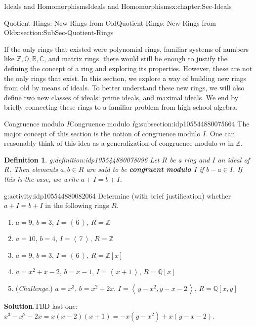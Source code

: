 \documentclass[oneside,10pt,]{book}
\newcommand{\blocktitlefont}{\relax}
\newcommand{\terminology}[1]{\textbf{#1}}
\numberwithin{equation}{section}
\newcommand{\ideal}[1]{\left\langle\, #1 \,\right\rangle}
\def\C{{\mathbb C}}
\def\Z{{\mathbb Z}}
\def\Q{{\mathbb Q}}
\def\R{{\mathbb R}}
\newtheorem{definition}[theorem]{Definition}
\begin{document}
\begin{chapterptx}{Ideals and Homomorphisms}{}{Ideals and Homomorphisms}{}{}{x:chapter:Sec-Ideals}
\begin{sectionptx}{Quotient Rings: New Rings from Old}{}{Quotient Rings: New Rings from Old}{}{}{x:section:SubSec-Quotient-Rings}
\begin{introduction}{}
If the only rings that existed were polynomial rings, familiar systems of numbers like \(\Z, \Q, \R, \C\), and matrix rings, there would still be enough to justify the defining the concept of a ring and exploring its properties. However, these are not the only rings that exist. In this section, we explore a way of building new rings from old by means of ideals. To better understand these new rings, we will also define two new classes of ideals: prime ideals, and maximal ideals. We end by briefly connecting these rings to a familiar problem from high school algebra.%
\end{introduction}%
%
%
\typeout{************************************************}
\typeout{************************************************}
%
\begin{subsectionptx}{Congruence modulo \(I\)}{}{Congruence modulo \(I\)}{}{}{g:subsection:idp105544880075664}
The major concept of this section is the notion of congruence modulo \(I\). One can reasonably think of this idea as a generalization of congruence modulo \(m\) in \(\Z\).%
\begin{definition}{}{g:definition:idp105544880078096}%
%
Let \(R\) be a ring and \(I\) an ideal of \(R\). Then elements \(a,b\in R\) are said to be \terminology{congruent modulo \(I\)} if \(b-a\in I\). If this is the case, we write \(a + I = b + I\).%
\end{definition}
\begin{activity}{}{g:activity:idp105544880082064}%
Determine (with brief justification) whether \(a + I = b + I\) in the following rings \(R\).%
%
\begin{enumerate}
\item{}\(a = 9\), \(b = 3\), \(I = \ideal{6}\), \(R = \Z\)%
\item{}\(a = 10\), \(b = 4\), \(I = \ideal{7}\), \(R = \Z\)%
\item{}\(a = 9\), \(b = 3\), \(I = \ideal{6}\), \(R = \Z[x]\)%
\item{}\(a = x^2+x-2\), \(b = x-1\), \(I = \ideal{x+1}\), \(R = \Q[x]\)%
\item{}(\emph{Challenge.}) \(a = x^3\), \(b = x^2+2x\), \(I = \ideal{y-x^2, y-x-2}\), \(R = \Q[x,y]\)%
\end{enumerate}
\par\smallskip%
\noindent\textbf{\blocktitlefont Solution}.\hypertarget{g:solution:idp105544880026384}{}\quad{}TBD last one: \(x^3 - x^2 - 2x = x(x-2)(x+1) = -x(y-x^2) + x(y-x-2)\).\end{activity}%

\end{subsectionptx}
\end{sectionptx}
\end{chapterptx}
\end{document}
